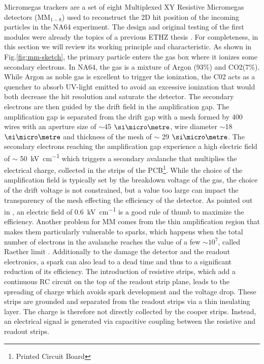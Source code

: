 Micromegas trackers are a set of eight Multiplexed XY Resistive Micromegas detectors (MM$_{1-8}$) used to reconstruct the 2D hit position of the incoming particles in the NA64 experiment. The design and original testing of the first modules were already the topics of a previous ETHZ thesis \cite{dbanerjee-thesis}. For completeness, in this section we will review its working principle and characteristic. As shown in Fig.\ref{fig:mm-sketch}, the primary particle enters the gas box where it ionizes some secondary electrons. In NA64, the gas is a mixture of Argon (93\%) and CO2(7\%). While Argon as noble gas is excellent to trigger the ionization, the C02 acts as a quencher to absorb UV-light emitted to avoid an excessive ionization that would both decrease the hit resolution and saturate the detector. The secondary electrons are then guided by the drift field in the amplification gap. The amplification gap is separated from the drift gap with a mesh formed by 400 wires with an aperture size of $\sim$45 $\mum$, wire diameter $\sim$18 $\mum$ and thickness of the mesh of $\sim$ 29 $\mum$. The secondary electrons reaching the amplification gap experience a high electric field of $\sim$ \SI{50}{\kilo\volt\per\centi\metre} which triggers a secondary avalanche that multiplies the electrical charge, collected in the strips of the PCB\footnote{Printed Circuit Board}. While the choice of the amplification field is typically set by the breakdown voltage of the gas, the choice of the drift voltage is not constrained, but a value too large can impact the transparency of the mesh effecting the efficiency of the detector. As pointed out in \cite{Bortfeldt:2014vvt}, an electric field of \SI{0.6}{\kilo\volt\per\centi\metre} is a good rule of thumb to maximize the efficiency. Another problem for MM comes from the thin amplification region that makes them particularly vulnerable to sparks, which happens when the total number of electrons in the avalanche reaches the value of a few $\sim 10^7$, called Raether limit \cite{BAY2002162,BRESSAN1999321,Raether:102989}. Additionally to the damage the detector and the readout electronics, a spark can also lead to a dead time and thus to a significant reduction of its efficiency. The introduction of resistive strips, which add a continuous RC circuit on the top of the readout strip plane, leads to the spreading of charge which avoids spark development and the voltage drop. These strips are grounded and separated from the readout strips via a thin insulating layer. The charge is therefore not directly collected by the cooper strips. Instead, an electrical signal is generated via capacitive coupling between the resistive and readout strips.

